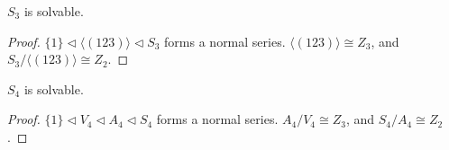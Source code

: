 \begin{proposition}\label{prop:s3-solvable}
    \(S_3\) is solvable.
\end{proposition}
\begin{proof}
    \(\{1\} \lhd \langle(123)\rangle \lhd S_3\) forms a normal series.
    \(\langle(123)\rangle \cong Z_3\),
    and \(S_3/\langle(123)\rangle \cong Z_2\).
\end{proof}
\begin{proposition}\label{prop:s4-solvable}
    \(S_4\) is solvable.
\end{proposition}
\begin{proof}
    \(\{1\} \lhd V_4 \lhd A_4 \lhd S_4\) forms a normal series.
    \(A_4/V_4 \cong Z_3\),
    and \(S_4/A_4 \cong Z_2\).
\end{proof}

